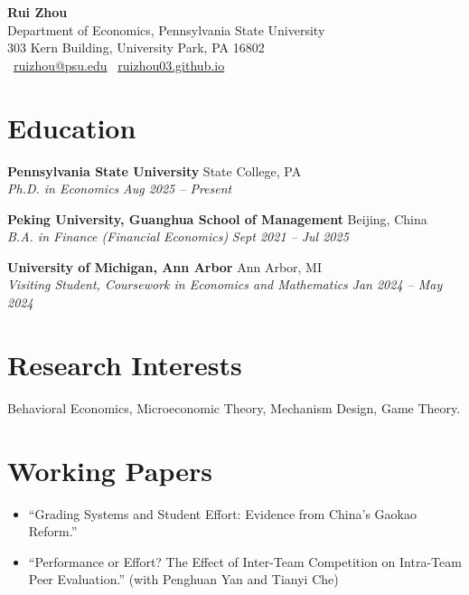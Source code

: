\documentclass[letterpaper,11pt]{article}
\newcommand\Colorhref[3][black]{\href{#2}{\color{#1}#3}}
\begin{document}
\begin{center}
    {\Huge\textbf{Rui Zhou}} \\[8pt]
    \small
    Department of Economics, Pennsylvania State University \\
    303 Kern Building, University Park, PA 16802 \\[2pt]
    \faEnvelope \ \Colorhref[blue]{mailto:ruizhou@psu.edu}{ruizhou@psu.edu} \quad
    \faGlobe \ \Colorhref[blue]{https://ruizhou03.github.io/}{ruizhou03.github.io}
\end{center}
\vspace{6pt}

\section*{Education}

\noindent
\textbf{Pennsylvania State University} \hfill State College, PA \\
\textit{Ph.D. in Economics} \hfill \textit{Aug 2025 -- Present}

\vspace{4pt}

\noindent
\textbf{Peking University, Guanghua School of Management} \hfill Beijing, China \\
\textit{B.A. in Finance (Financial Economics)} \hfill \textit{Sept 2021 -- Jul 2025}

\vspace{4pt}

\noindent
\textbf{University of Michigan, Ann Arbor} \hfill Ann Arbor, MI \\
\textit{Visiting Student, Coursework in Economics and Mathematics} \hfill \textit{Jan 2024 -- May 2024}

\section*{Research Interests}
Behavioral Economics, Microeconomic Theory, Mechanism Design, Game Theory.

\section*{Working Papers}
\begin{itemize}[leftmargin=1.5em, noitemsep, topsep=4pt, itemsep=6pt]
    \item ``Grading Systems and Student Effort: Evidence from China's Gaokao Reform.''
    \item ``Performance or Effort? The Effect of Inter-Team Competition on Intra-Team Peer Evaluation.'' (with Penghuan Yan and Tianyi Che)
\end{itemize}
\end{document}
